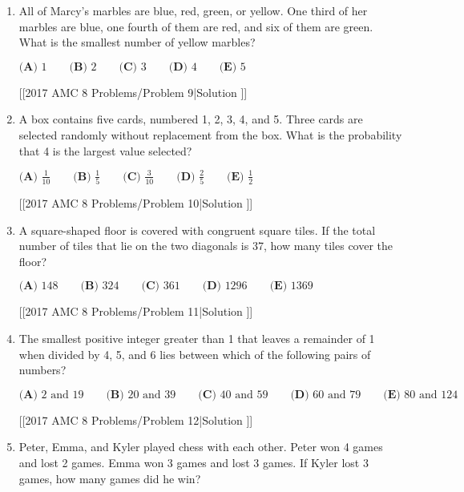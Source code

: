 \documentclass{article}
\begin{document}
\begin{enumerate}[label=\arabic*., itemsep=0.5em]
[[2017 AMC 8 Problems/Problem 8|Solution
]]\par \vspace{0.5em}\item All of Marcy's marbles are blue, red, green, or yellow. One third of her marbles are blue, one fourth of them are red, and six of them are green. What is the smallest number of yellow marbles?

\(\textbf{(A) }1\qquad\textbf{(B) }2\qquad\textbf{(C) }3\qquad\textbf{(D) }4\qquad\textbf{(E) }5\)

[[2017 AMC 8 Problems/Problem 9|Solution
]]\par \vspace{0.5em}\item A box contains five cards, numbered 1, 2, 3, 4, and 5. Three cards are selected randomly without replacement from the box. What is the probability that 4 is the largest value selected?

\(\textbf{(A) }\frac{1}{10}\qquad\textbf{(B) }\frac{1}{5}\qquad\textbf{(C) }\frac{3}{10}\qquad\textbf{(D) }\frac{2}{5}\qquad\textbf{(E) }\frac{1}{2}\)

[[2017 AMC 8 Problems/Problem 10|Solution
]]\par \vspace{0.5em}\item A square-shaped floor is covered with congruent square tiles. If the total number of tiles that lie on the two diagonals is 37, how many tiles cover the floor?

\(\textbf{(A) }148\qquad\textbf{(B) }324\qquad\textbf{(C) }361\qquad\textbf{(D) }1296\qquad\textbf{(E) }1369\)

[[2017 AMC 8 Problems/Problem 11|Solution
]]\par \vspace{0.5em}\item The smallest positive integer greater than 1 that leaves a remainder of 1 when divided by 4, 5, and 6 lies between which of the following pairs of numbers?

\(\textbf{(A) }2\text{ and }19\qquad\textbf{(B) }20\text{ and }39\qquad\textbf{(C) }40\text{ and }59\qquad\textbf{(D) }60\text{ and }79\qquad\textbf{(E) }80\text{ and }124\)

[[2017 AMC 8 Problems/Problem 12|Solution
]]\par \vspace{0.5em}\item Peter, Emma, and Kyler played chess with each other. Peter won 4 games and lost 2 games. Emma won 3 games and lost 3 games. If Kyler lost 3 games, how many games did he win?


\end{enumerate}
\end{document}
